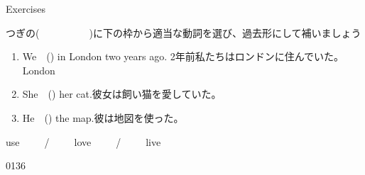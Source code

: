 \documentclass[aspectratio=169,xcolor={dvipsnames,table}]{beamer}
\newcommand{\myaudio}[1]{\href{#1}{\faVolumeUp}}
\begin{document}
\begin{frame}[plain]{Exercises}

{\small つぎの(~~~~~~~~~~)に下の枠から適当な動詞を選び、過去形にして補いましょう}

\begin{enumerate}
	\item We~~() in London two years ago.  {\small 2年前私たちはロンドンに住んでいた。}\\%
\hfill{\scriptsize London }    
 \item She~~() her cat.{\small 彼女は飼い猫を愛していた}。
	\item He~~() the map.{\small 彼は地図を使った。}
\end{enumerate}

\bigskip

\begin{tcolorbox}[title=この中から選んでください]
\centering
use~~~~~/~~~~~love~~~~~/~~~~~live
\end{tcolorbox}
\hfill{\tiny 0136}\,{\scriptsize\myaudio{./audio/025_past_do_07.mp3}}
\end{frame}
\end{document}
